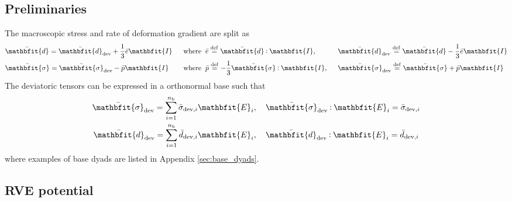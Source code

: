 \documentclass[12pt,a4paper,fleqn]{article}
\renewcommand{\ts}[1]{\mathbfit{#1}}
\begin{document}
\subsection{Preliminaries}
The macroscopic stress and rate of deformation gradient are split as
\begin{alignat}{3}
    &\bar{\ts d} = \bar{\ts d}_\dev + \frac{1}{3}\bar{e} \ts I
    &\;\;&\text{where}\;\; \bar{e} \defeq \bar{\ts d}\dprod \ts I,&\;\;& \bar{\ts d}_\dev \defeq \bar{\ts d} - \frac13\bar{e}\ts I \\
    &\bar{\ts\sigma} = \bar{\ts\sigma}_\dev - \bar{p} \ts I
    &\;\;&\text{where}\;\; \bar{p} \defeq -\frac13 \bar{\ts\sigma}\dprod \ts I,&\;\;& \bar{\ts\sigma}_\dev \defeq \bar{\ts\sigma} + \bar{p} \ts I
\end{alignat}
The deviatoric tensors can be expressed in a orthonormal base such that
\begin{subequations}
\begin{gather}
 \bar{\ts\sigma}_\dev = \sum_{i=1}^{n_{\mathrm{b}}} \bar{\sigma}_{\dev,i} \ts E_i,\quad \bar{\ts\sigma}_\dev \dprod \ts E_i = \bar{\sigma}_{\dev,i}
\label{eq:sigma_base} \\
 \bar{\ts d}_\dev = \sum_{i=1}^{n_{\mathrm{b}}} \bar{d}_{\dev,i} \ts E_i,\quad \bar{\ts d}_\dev \dprod \ts E_i = \bar{d}_{\dev,i}
\label{eq:d_base}
\end{gather}
\end{subequations}
where examples of base dyads are listed in Appendix \ref{sec:base_dyads}.

\subsection{RVE potential}
\end{document}
